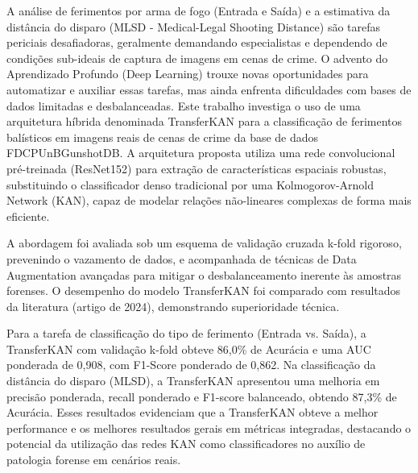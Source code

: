 A análise de ferimentos por arma de fogo (Entrada e Saída) e a estimativa da distância do disparo (MLSD - Medical-Legal Shooting Distance) são tarefas periciais desafiadoras, geralmente demandando especialistas e dependendo de condições sub-ideais de captura de imagens em cenas de crime. O advento do Aprendizado Profundo (Deep Learning) trouxe novas oportunidades para automatizar e auxiliar essas tarefas, mas ainda enfrenta dificuldades com bases de dados limitadas e desbalanceadas.
Este trabalho investiga o uso de uma arquitetura híbrida denominada TransferKAN para a classificação de ferimentos balísticos em imagens reais de cenas de crime da base de dados FDCPUnBGunshotDB. A arquitetura proposta utiliza uma rede convolucional pré-treinada (ResNet152) para extração de características espaciais robustas, substituindo o classificador denso tradicional por uma Kolmogorov-Arnold Network (KAN), capaz de modelar relações não-lineares complexas de forma mais eficiente.

A abordagem foi avaliada sob um esquema de validação cruzada k-fold rigoroso, prevenindo o vazamento de dados, e acompanhada de técnicas de Data Augmentation avançadas para mitigar o desbalanceamento inerente às amostras forenses. O desempenho do modelo TransferKAN foi comparado com resultados da literatura (artigo de 2024), demonstrando superioridade técnica.

Para a tarefa de classificação do tipo de ferimento (Entrada vs. Saída), a TransferKAN com validação k-fold obteve 86,0\% de Acurácia e uma AUC ponderada de 0,908, com F1-Score ponderado de 0,862. Na classificação da distância do disparo (MLSD), a TransferKAN apresentou uma melhoria em precisão ponderada, recall ponderado e F1-score balanceado, obtendo 87,3\% de Acurácia. Esses resultados evidenciam que a TransferKAN obteve a melhor performance e os melhores resultados gerais em métricas integradas, destacando o potencial da utilização das redes KAN como classificadores no auxílio de patologia forense em cenários reais.
